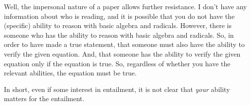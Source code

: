 \begin{note}[Difficulty]
  Well, the impersonal nature of a paper allows further resistance.
  I don't have any information about who is reading, and it is possible that you do not have the (specific) ability to reason with basic algebra and radicals.
  However, there is someone who has the ability to reason with basic algebra and radicals.
  So, in order to have made a true statement, that someone must also have the ability to verify the given equation.
  And, that someone has the ability to verify the given equation only if the equation is true.
  So, regardless of whether you have the relevant abilities, the equation must be true.

  In short, even if some interest in entailment, it is not clear that \emph{your} ability matters for the entailment.
\end{note}

